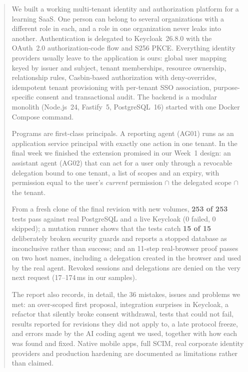 \begin{abstract}
We built a working multi-tenant identity and authorization platform for a learning SaaS. One person can belong to several organizations with a different role in each, and a role in one organization never leaks into another. Authentication is delegated to Keycloak~26.8.0 with the OAuth~2.0 authorization-code flow and S256 PKCE. Everything identity providers usually leave to the application is ours: global user mapping keyed by issuer and subject, tenant memberships, resource ownership, relationship rules, Casbin-based authorization with deny-overrides, idempotent tenant provisioning with per-tenant SSO association, purpose-specific consent and transactional audit. The backend is a modular monolith (Node.js~24, Fastify~5, PostgreSQL~16) started with one Docker Compose command.

Programs are first-class principals. A reporting agent (AG01) runs as an application service principal with exactly one action in one tenant. In the final week we finished the extension promised in our Week~1 design: an assistant agent (AG02) that can act for a user only through a revocable delegation bound to one tenant, a list of scopes and an expiry, with permission equal to the user's \emph{current} permission $\cap$ the delegated scope $\cap$ the tenant.

From a fresh clone of the final revision with new volumes, \textbf{253 of 253} tests pass against real PostgreSQL and a live Keycloak (0 failed, 0 skipped); a mutation runner shows that the tests catch \textbf{15 of 15} deliberately broken security guards and reports a stopped database as inconclusive rather than success; and an 11-step real-browser proof passes on two host names, including a delegation created in the browser and used by the real agent. Revoked sessions and delegations are denied on the very next request (17--174\,ms in our samples).

The report also records, in detail, the 36 mistakes, issues and problems we met: an over-scoped first proposal, integration surprises in Keycloak, a refactor that silently broke consent withdrawal, tests that could not fail, results reported for revisions they did not apply to, a late protocol freeze, and errors made by the AI coding agent we used, together with how each was found and fixed. Native mobile apps, full SCIM, real corporate identity providers and production hardening are documented as limitations rather than claimed.
\end{abstract}
